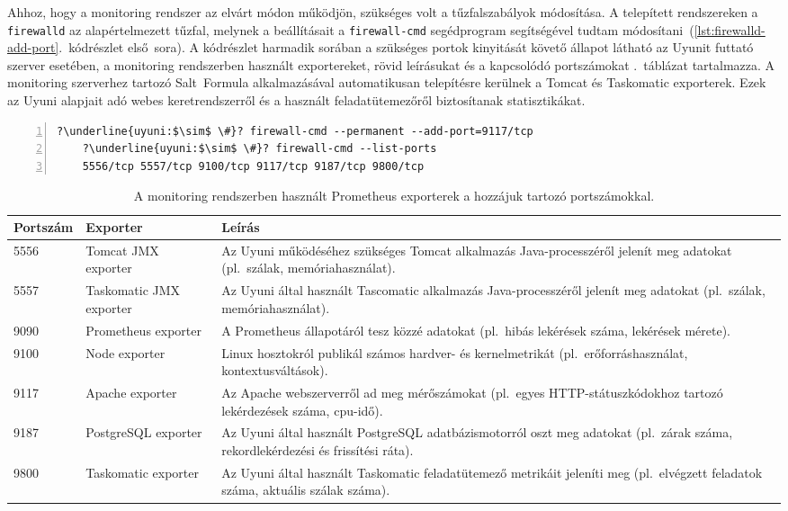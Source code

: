 Ahhoz, hogy a monitoring rendszer az elvárt módon működjön, szükséges volt a tűzfalszabályok módosítása. A telepített rendszereken a \texttt{firewalld} az alapértelmezett tűzfal, melynek a beállításait a \texttt{firewall-cmd} segédprogram segítségével tudtam módosítani~(\ref{lst:firewalld-add-port}.~kódrészlet első~sora). A kódrészlet harmadik sorában a szükséges portok kinyitását követő állapot látható az Uyunit futtató szerver esetében, a monitoring rendszerben használt exportereket, rövid leírásukat és a kapcsolódó portszámokat .~táblázat tartalmazza. A monitoring szerverhez tartozó Salt~Formula alkalmazásával automatikusan telepítésre kerülnek a Tomcat és Taskomatic exporterek. Ezek az Uyuni alapjait adó webes keretrendszerről és a használt feladatütemezőről biztosítanak statisztikákat.

\vspace{2mm}
\begin{lstlisting}[caption=Tűzfalszabályok módosítása.,label=lst:firewalld-add-port, numbers=left,escapechar=?]
	?\underline{uyuni:$\sim$ \#}? firewall-cmd --permanent --add-port=9117/tcp
	?\underline{uyuni:$\sim$ \#}? firewall-cmd --list-ports
	5556/tcp 5557/tcp 9100/tcp 9117/tcp 9187/tcp 9800/tcp
\end{lstlisting}

\begin{table}[h]
	\setlength{\tabcolsep}{5pt}
	\renewcommand{\arraystretch}{1.3}
	\centering
	\begin{tabular}{||l l m{7.6cm}||}
		\hline
		Portszám & Exporter & Leírás \\
		\hline\hline
		5556 & Tomcat JMX exporter & Az Uyuni működéséhez szükséges Tomcat alkalmazás Java-processzéről jelenít meg adatokat (pl.~szálak, memóriahasználat). \\
		\hline
		5557 & Taskomatic JMX exporter & Az Uyuni által használt Tascomatic alkalmazás Java-processzéről jelenít meg adatokat (pl.~szálak, memóriahasználat). \\
		\hline
		9090 & Prometheus exporter & A Prometheus állapotáról tesz közzé adatokat (pl.~hibás lekérések száma, lekérések mérete).  \\
		\hline
		9100 & Node exporter & Linux hosztokról publikál számos hardver- és kernelmetrikát (pl.~erőforráshasználat, kontextusváltások). \\
		\hline
		9117 & Apache exporter & Az Apache webszerverről ad meg mérőszámokat (pl.~egyes HTTP-státuszkódokhoz tartozó lekérdezések száma, \acrshort{cpu}-idő).  \\
		\hline
		9187 & PostgreSQL exporter & Az Uyuni által használt PostgreSQL adatbázismotorról oszt meg adatokat (pl.~zárak száma, rekordlekérdezési és frissítési ráta).  \\
		\hline
		9800 & Taskomatic exporter & Az Uyuni által használt Taskomatic feladatütemező metrikáit jeleníti meg (pl.~elvégzett feladatok száma, aktuális szálak száma).  \\
		\hline
	\end{tabular}
	\caption{A monitoring rendszerben használt Prometheus exporterek a hozzájuk tartozó portszámokkal.}
	\label{tab:monitoring-exporters}
\end{table}

